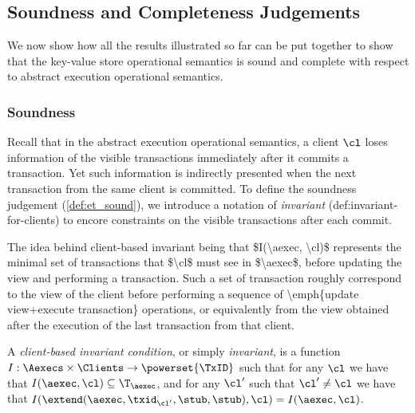 \subsection{Soundness and Completeness Judgements}
\label{sec:kv2aexec-sound-complete}

We now show how all the results illustrated so far 
can be put together to show that the key-value store operational semantics 
is sound and complete with respect to abstract execution operational semantics.

\subsubsection{Soundness}
Recall that in the abstract execution operational semantics,
a client \( \cl \) loses information of the visible transactions immediately after it commits a transaction.
Yet such information is indirectly presented when the next transaction from the same client is committed.
To define the soundness judgement (\cref{def:et_sound}), we introduce a notation of \emph{invariant} ({def:invariant-for-clients})
to encore constraints on the visible transactions after each commit.

\ac{The idea behind client-based invariant being that $I(\aexec, \cl)$ represents 
the minimal set of transactions that $\cl$ must see in $\aexec$, before 
updating the view and performing a transaction. Such a set of transaction 
roughly correspond to the view of the client before performing a 
sequence of \emph{update view+execute transaction} operations, 
or equivalently from the view obtained after the execution of the 
last transaction from that client.}

\begin{definition}
\label{def:invariant-for-clients}
A \emph{client-based invariant condition}, or simply \emph{invariant}, is a 
function $I : \Aexecs \times \Clients \rightarrow \powerset{\TxID}$ 
such that for any $\cl$ we have that $I(\aexec, \cl) \subseteq \T_{\aexec}$, and 
for any  $\cl'$ such that $\cl' \neq \cl$ we have that 
$I(\extend(\aexec, \txid_{\cl'}^{\cdot}, \stub, \stub), \cl) = I(\aexec, \cl)$.
\end{definition}



